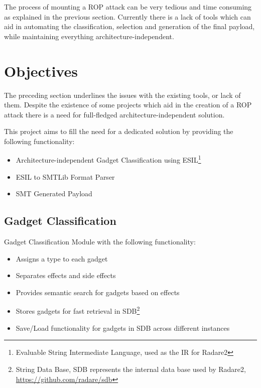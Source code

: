 The process of mounting a ROP attack can be very tedious and time consuming as explained in the previous section. Currently there is a lack of tools which can aid in automating the classification, selection and generation of the final payload, while maintaining everything architecture-independent.

\section{Objectives}
\label{sec:objectives}

The preceding section underlines the issues with the existing tools, or lack of them. Despite the existence of some projects which aid in the creation of a ROP attack there is a need for full-fledged architecture-independent solution.

This project aims to fill the need for a dedicated solution by providing the following functionality:
\begin{itemize}
	\item Architecture-independent Gadget Classification using ESIL\footnote{Evaluable String Intermediate Language, used as the IR for Radare2}
	\item ESIL to SMTLib Format Parser
	\item SMT Generated Payload
\end{itemize}

\subsection{Gadget Classification}

Gadget Classification Module with the following functionality:
\begin{itemize}
	\item Assigns a type to each gadget
	\item Separates effects and side effects
	\item Provides semantic search for gadgets based on effects
	\item Stores gadgets for fast retrieval in SDB\footnote{String Data Base, SDB represents the internal data base used by Radare2, \url{https://github.com/radare/sdb}}
	\item Save/Load functionality for gadgets in SDB across different instances
\end{itemize}

